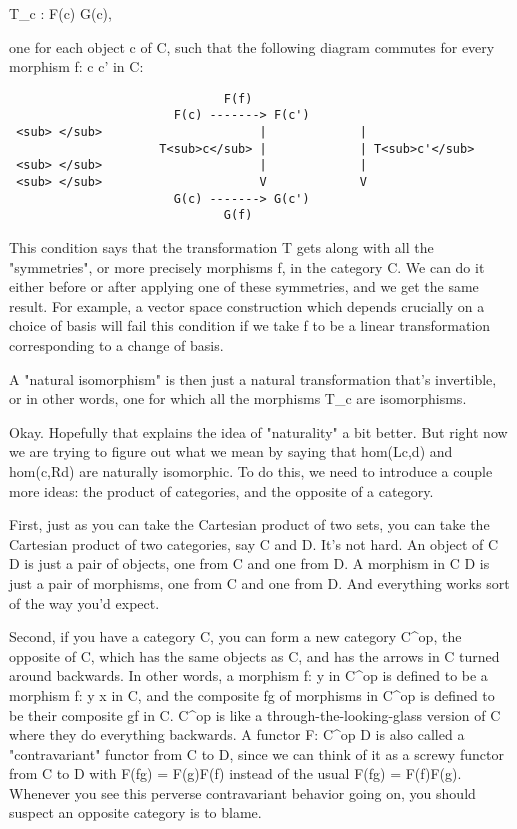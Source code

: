 T_{c} : F(c) \to  G(c),

one for each object c of C, such that the following diagram 
commutes for every morphism f: c \to  c' in C: 

\begin{verbatim}
                              F(f)
                       F(c) -------> F(c') 
 <sub> </sub>                      |             |
                     T<sub>c</sub> |             | T<sub>c'</sub>
 <sub> </sub>                      |             |
 <sub> </sub>                      V             V
                       G(c) -------> G(c')
                              G(f)

\end{verbatim}
    
This condition says that the transformation T gets along with all the
"symmetries", or more precisely morphisms f, in the category C.   We
can do it either before or after applying one of these symmetries, and
we get the same result.  For example, a vector space construction which 
depends crucially on a choice of basis will fail this condition if we take 
f to be a linear transformation corresponding to a change of basis. 

A "natural isomorphism" is then just a natural transformation that's
invertible, or in other words, one for which all the morphisms T_{c}
are isomorphisms.

Okay.  Hopefully that explains the idea of "naturality" a bit better.
But right now we are trying to figure out what we mean by 
saying that hom(Lc,d) and hom(c,Rd) are naturally isomorphic.  To do this, 
we need to introduce a couple more ideas: the product of categories,
and the opposite of a category.

First, just as you can take the Cartesian product of two sets, you can take
the Cartesian product of two categories, say C and D.
It's not hard.   An object of C \times  D is just a pair of objects,
one from C and one from D.  A morphism in C \times  D is just a pair of morphisms,
one from C and one from D.  And everything works sort of the way you'd expect.

Second, if you have a category C, you can form a new category
C^{op}, the opposite of C, which has the same objects as C, and
has the arrows in C turned around backwards.  In other words, a morphism
f: \times  \to  y in C^{op} is defined to be a morphism f: y \to  x
in C, and the composite fg of morphisms in C^{op} is defined to
be their composite gf in C.  C^{op} is like a
through-the-looking-glass version of C where they do everything
backwards.  A functor F: C^{op} \to  D is also called a
"contravariant" functor from C to D, since we can think of it
as a screwy functor from C to D with F(fg) = F(g)F(f) instead of the
usual F(fg) = F(f)F(g).  Whenever you see this perverse contravariant
behavior going on, you should suspect an opposite category is to blame.

